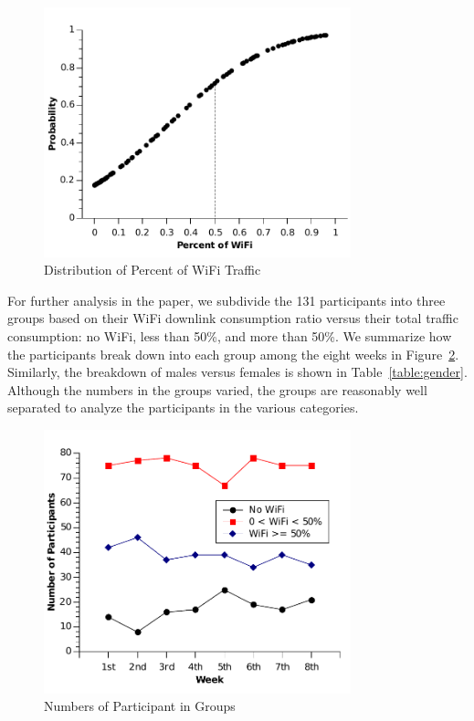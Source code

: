 \begin{figure}[h!tbp]
\centering
\includegraphics[width = 3.5in]{graphs/distribution.pdf}
\caption{Distribution of Percent of WiFi Traffic} 
\label{fig:distribution}
\end{figure}

For further analysis in the paper, we subdivide the 131 participants into three groups based on their WiFi downlink consumption
ratio versus their total traffic consumption: no WiFi, less than 50\%, and more than 50\%.  We summarize how the participants
break down into each group among the eight weeks in Figure~\ref{fig:number}.  Similarly, the breakdown of males versus females
is shown in Table~\ref{table:gender}. Although the numbers in the  
groups varied, the groups are reasonably well separated to analyze the participants in the various categories.  

\begin{figure}[h!tbp]
\centering
\includegraphics[width = 3.5in]{graphs/number.pdf}
\caption{Numbers of Participant in Groups} 
\label{fig:number}
\end{figure}

